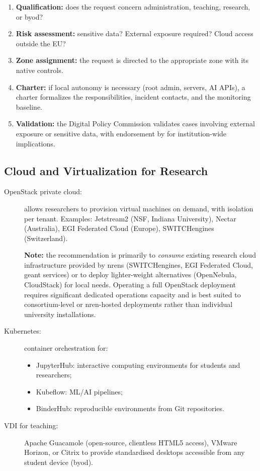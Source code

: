 \begin{enumerate}[nosep]
    \item \textbf{Qualification:} does the request concern
    administration, teaching, research, or \gls{byod}?
    \item \textbf{Risk assessment:} sensitive data? External exposure
    required? Cloud access outside the EU?
    \item \textbf{Zone assignment:} the request is directed to
    the appropriate zone with its native controls.
    \item \textbf{Charter:} if local autonomy is necessary
    (root admin, servers, AI APIs), a charter formalizes the
    responsibilities, incident contacts, and the monitoring baseline.
    \item \textbf{Validation:} the Digital Policy Commission validates
    cases involving external exposure or sensitive data, with
    endorsement by  for
    institution-wide implications.
\end{enumerate}

\subsection{Cloud and Virtualization for Research}

\begin{description}
    \item[OpenStack private cloud:] allows researchers to provision
    virtual machines on demand, with isolation per tenant.
    Examples: Jetstream2 (NSF, Indiana University), Nectar
    (Australia), EGI Federated Cloud (Europe), SWITCHengines (Switzerland).

    \textbf{Note:} the recommendation is primarily to \emph{consume}
    existing research cloud infrastructure provided by \gls{nren}s
    (SWITCHengines, EGI Federated Cloud, \gls{geant} services) or to deploy
    lighter-weight alternatives (OpenNebula, CloudStack) for local
    needs. Operating a full OpenStack deployment requires significant
    dedicated operations capacity and is best suited to consortium-level
    or \gls{nren}-hosted deployments rather than individual university
    installations.

    \item[Kubernetes:] container orchestration for:
    \begin{itemize}[nosep]
        \item JupyterHub: interactive computing environments for
        students and researchers;
        \item Kubeflow: ML/AI pipelines;
        \item BinderHub: reproducible environments from
        Git repositories.
    \end{itemize}
    \item[VDI for teaching:] Apache Guacamole (open-source,
    clientless HTML5 access), VMware Horizon, or Citrix to provide
    standardised desktops accessible from any student
    device (\gls{byod}).
\end{description}

